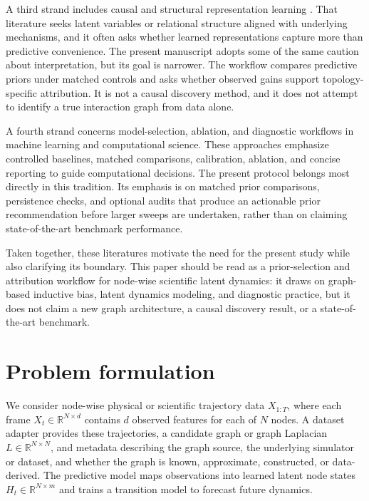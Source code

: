 \documentclass[preprint,12pt]{elsarticle}
\begin{document}
A third strand includes causal and structural representation learning \citep{scholkopf2021toward}. That literature seeks latent variables or relational structure aligned with underlying mechanisms, and it often asks whether learned representations capture more than predictive convenience. The present manuscript adopts some of the same caution about interpretation, but its goal is narrower. The workflow compares predictive priors under matched controls and asks whether observed gains support topology-specific attribution. It is not a causal discovery method, and it does not attempt to identify a true interaction graph from data alone.

A fourth strand concerns model-selection, ablation, and diagnostic workflows in machine learning and computational science. These approaches emphasize controlled baselines, matched comparisons, calibration, ablation, and concise reporting to guide computational decisions. The present protocol belongs most directly in this tradition. Its emphasis is on matched prior comparisons, persistence checks, and optional audits that produce an actionable prior recommendation before larger sweeps are undertaken, rather than on claiming state-of-the-art benchmark performance.

Taken together, these literatures motivate the need for the present study while also clarifying its boundary. This paper should be read as a prior-selection and attribution workflow for node-wise scientific latent dynamics: it draws on graph-based inductive bias, latent dynamics modeling, and diagnostic practice, but it does not claim a new graph architecture, a causal discovery result, or a state-of-the-art benchmark.

\section{Problem formulation}

We consider node-wise physical or scientific trajectory data $X_{1:T}$, where each frame $X_t \in \mathbb{R}^{N\times d}$ contains $d$ observed features for each of $N$ nodes. A dataset adapter provides these trajectories, a candidate graph or graph Laplacian $L \in \mathbb{R}^{N\times N}$, and metadata describing the graph source, the underlying simulator or dataset, and whether the graph is known, approximate, constructed, or data-derived. The predictive model maps observations into learned latent node states $H_t \in \mathbb{R}^{N\times m}$ and trains a transition model to forecast future dynamics.
\end{document}
